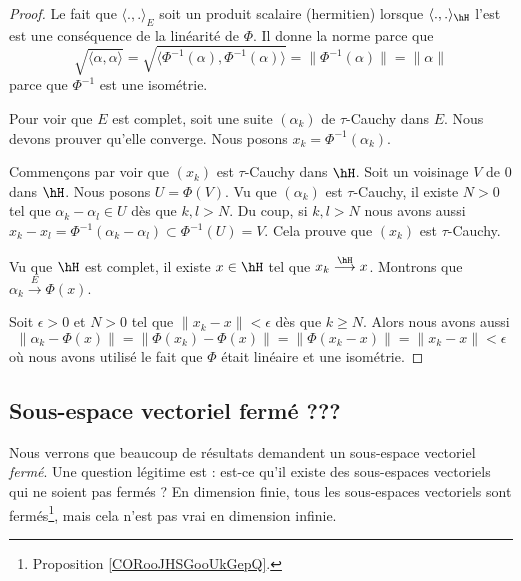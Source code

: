 \begin{proof}
	Le fait que \( \langle ., .\rangle_E\) soit un produit scalaire (hermitien) lorsque \( \langle ., .\rangle_{\hH}\) l'est est une conséquence de la linéarité de \( \Phi\). Il donne la norme parce que
	\begin{equation}
		\sqrt{ \langle \alpha , \alpha\rangle  }=\sqrt{ \langle \Phi^{-1}(\alpha), \Phi^{-1}(\alpha)\rangle  }=\| \Phi^{-1}(\alpha) \|=\| \alpha \|
	\end{equation}
	parce que \( \Phi^{-1}\) est une isométrie.

	Pour voir que \( E\) est complet, soit une suite \( (\alpha_k)\) de \( \tau\)-Cauchy dans \( E\). Nous devons prouver qu'elle converge. Nous posons \( x_k=\Phi^{-1}(\alpha_k)\).

	Commençons par voir que \( (x_k)\) est \( \tau\)-Cauchy dans \( \hH\). Soit un voisinage \( V\) de \( 0\) dans \( \hH\). Nous posons \( U=\Phi(V)\). Vu que \( (\alpha_k)\) est \( \tau\)-Cauchy, il existe \( N>0\) tel que \( \alpha_k-\alpha_l\in U\) dès que \( k,l>N\). Du coup, si \( k,l>N\) nous avons aussi \( x_k-x_l=\Phi^{-1}(\alpha_k-\alpha_l)\subset\Phi^{-1}(U)=V\). Cela prouve que \( (x_k)\) est \( \tau\)-Cauchy.

	Vu que \( \hH\) est complet, il existe \( x\in \hH\) tel que \( x_k\stackrel{\hH}{\longrightarrow}x\). Montrons que \( \alpha_k\stackrel{E}{\longrightarrow}\Phi(x)\).

	Soit \( \epsilon>0\) et \( N>0\) tel que \( \| x_k-x \|<\epsilon\) dès que \( k\geq N\). Alors nous avons aussi
	\begin{equation}
		\| \alpha_k-\Phi(x) \|=\| \Phi(x_k)-\Phi(x) \|=\| \Phi(x_k-x) \|=\| x_k-x \|<\epsilon
	\end{equation}
	où nous avons utilisé le fait que \( \Phi\) était linéaire et une isométrie.
\end{proof}

\subsection{Sous-espace vectoriel fermé ???}

Nous verrons que beaucoup de résultats demandent un sous-espace vectoriel \emph{fermé}. Une question légitime est : est-ce qu'il existe des sous-espaces vectoriels qui ne soient pas fermés ? En dimension finie, tous les sous-espaces vectoriels sont fermés\footnote{Proposition \ref{CORooJHSGooUkGepQ}.}, mais cela n'est pas vrai en dimension infinie.

